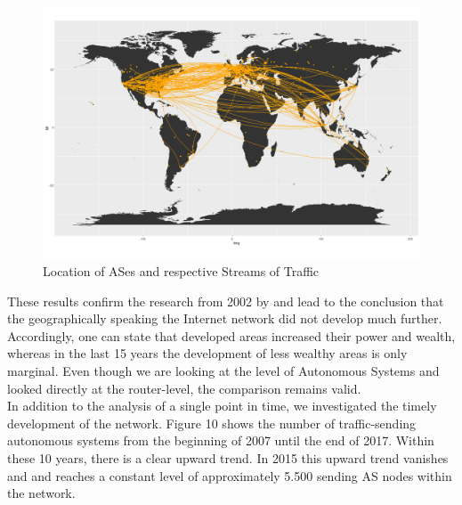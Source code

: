 \documentclass[conference, 11pt]{IEEEtran}
\begin{document}
\vspace{0.5cm}
\begin{figure}[h]
\centerline{\includegraphics[width=\columnwidth]{Graphics/connectedASes.png}}
\caption{Location of ASes and respective Streams of Traffic}
\label{fig}
\end{figure}
\vspace{0.5cm}


These results confirm the research from 2002 by \cite{geoResearch} and lead to the conclusion that the geographically speaking the Internet network did not develop much further. Accordingly, one can state that developed areas increased their power and wealth, whereas in the last 15 years the development of less wealthy areas is only marginal. Even though we are looking at the level of Autonomous Systems and \cite{geoResearch} looked directly at the router-level, the comparison remains valid. \\


In addition to the analysis of a single point in time, we investigated the timely development of the network. Figure 10 shows the number of traffic-sending autonomous systems from the beginning of 2007 until the end of 2017. Within these 10 years, there is a clear upward trend. In 2015 this upward trend vanishes and and reaches a constant level of approximately 5.500 sending AS nodes within the network. \\
\end{document}
